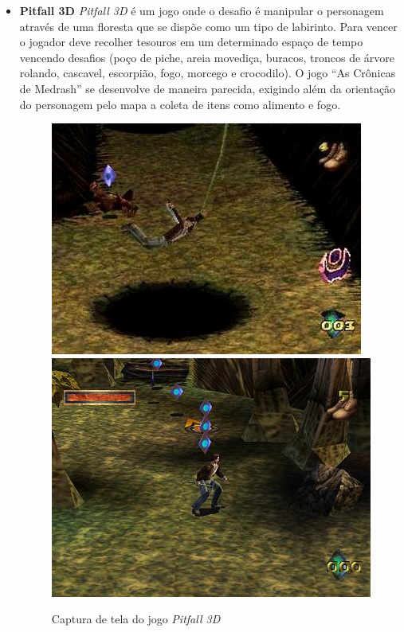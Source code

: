 \begin{itemize}
\item {\bf Pitfall 3D\cite{bib:pitfall_game}}
\textit{Pitfall 3D}
 é um jogo onde o desafio é manipular o personagem através de uma floresta 
que se dispõe como um tipo de labirinto. Para vencer o jogador deve recolher 
tesouros em um determinado espaço de tempo vencendo desafios (poço de piche, 
areia movediça, buracos, troncos de árvore rolando, cascavel, escorpião, fogo, 
morcego e crocodilo).
O jogo ``As Crônicas de Medrash'' se desenvolve de maneira parecida, exigindo 
além da orientação do personagem pelo mapa a coleta de itens como alimento e fogo.

\begin{figure}[!ht]
 \centering
 \includegraphics[scale=0.62]{Imagens/pit1.png}
 \includegraphics[scale=0.6]{Imagens/pit2.png}
 \caption{Captura de tela do jogo \textit{Pitfall 3D}}
 \label{img:pitfall}
\end{figure}

\end{itemize}